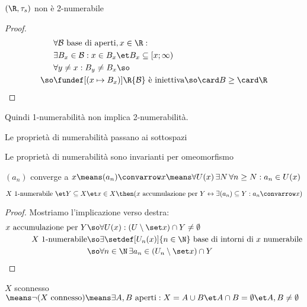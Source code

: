 \begin{prop}
$(\R,\tau_s)$ non è 2-numerabile
\end{prop}
\begin{proof}
\begin{align*}
&\forall\mathcal B\text{ base di aperti},x\in\R:\\
&\exists B_x\in\mathcal B:x\in B_x\et B_x\subseteq [x;\infty)\\
&\forall y\neq x:B_y\neq B_x\so\\
\so&\fundef[(x\mapsto B_x)]\R{\mathcal B}\text{ è iniettiva}\so\card B\geq\card\R \qedhere
\end{align*}
\end{proof}

\begin{oss}
Quindi 1-numerabilità non implica 2-numerabilità.
\end{oss}

\begin{prop}
Le proprietà di numerabilità passano ai sottospazi
\end{prop}

\begin{prop}
Le proprietà di numerabilità sono invarianti per omeomorfismo
\end{prop}

\begin{defn}[Convergenza]
$(a_n)$ converge a $x\means(a_n)\convarrow x\means\forall U(x)\,\exists N\,\forall n\geq N:a_n\in U(x)$
\end{defn}

\begin{prop}
$X\text{ 1-numerabile }\et Y\subseteq X\et x\in X\then(x\text{ accumulazione per }Y\leftrightarrow\exists(a_n)\subseteq Y:a_n\convarrow x)$
\end{prop}
\begin{proof}
Mostriamo l'implicazione verso destra:
\begin{align*}
x\text{ accumulazione per }Y\so&\forall U(x):(U\setminus\set x)\cap Y\neq\emptyset\\
X\text{ 1-numerabile}\so&\exists\setdef[U_n(x)]{n\in\N}\text{ base di intorni di }x\text{ numerabile}\\
\so&\forall n\in\N\,\exists a_n\in(U_n\setminus\set x)\cap Y \qedhere
\end{align*}
\end{proof}


\begin{defn}[Connessione]
$X$ sconnesso $\means\neg(X\text{ connesso})\means\exists A,B\text{ aperti}:X=A\cup B\et A\cap B=\emptyset\et A,B\neq\emptyset$
\end{defn}


